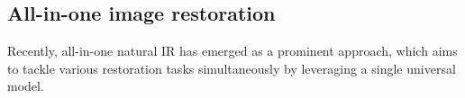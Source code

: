 \documentclass[lettersize,journal]{IEEEtran}
\begin{document}
\subsection{All-in-one image restoration}
Recently, all-in-one natural IR has emerged as a prominent approach, which aims to tackle various restoration tasks simultaneously by leveraging a single universal model.
\end{document}
